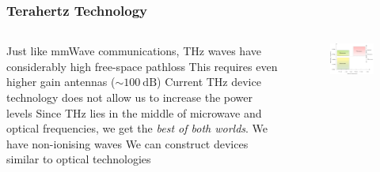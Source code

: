 \documentclass[10pt]{beamer}
\begin{document}
\begin{frame}
    \frametitle{Terahertz Technology}
    \normalsize
    \begin{columns}
        \normalsize
        \begin{column}{.6\textwidth}
            \begin{outline}
                \1 Just like mmWave communications, THz waves have considerably high free-space pathloss
                \2 This requires even higher gain antennas ($\sim \SI{100}{\dB}$)
                \1 Current THz device technology does not allow us to increase the power levels
                \1 Since THz lies in the middle of microwave and optical frequencies, we get the \textit{best of both worlds}.
                \2 We have non-ionising waves
                \2 We can construct devices similar to optical technologies
            \end{outline}
        \end{column}
        \begin{column}{.44\textwidth}
            \scriptsize
            \begin{figure}
                \centering
                \includegraphics[width=.95\textwidth]{Scale.pdf}
                \label{fig:Terahertz_technology}
            \end{figure}
            \begin{figure}
                \centering

\end{figure}
\end{column}
\end{columns}
\end{frame}
\end{document}

